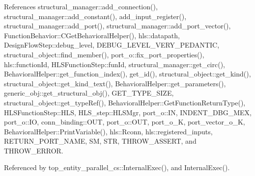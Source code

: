 References structural\+\_\+manager\+::add\+\_\+connection(), structural\+\_\+manager\+::add\+\_\+constant(), add\+\_\+input\+\_\+register(), structural\+\_\+manager\+::add\+\_\+port(), structural\+\_\+manager\+::add\+\_\+port\+\_\+vector(), Function\+Behavior\+::\+C\+Get\+Behavioral\+Helper(), hls\+::datapath, Design\+Flow\+Step\+::debug\+\_\+level, D\+E\+B\+U\+G\+\_\+\+L\+E\+V\+E\+L\+\_\+\+V\+E\+R\+Y\+\_\+\+P\+E\+D\+A\+N\+T\+IC, structural\+\_\+object\+::find\+\_\+member(), port\+\_\+o\+::fix\+\_\+port\+\_\+properties(), hls\+::function\+Id, H\+L\+S\+Function\+Step\+::fun\+Id, structural\+\_\+manager\+::get\+\_\+circ(), Behavioral\+Helper\+::get\+\_\+function\+\_\+index(), get\+\_\+id(), structural\+\_\+object\+::get\+\_\+kind(), structural\+\_\+object\+::get\+\_\+kind\+\_\+text(), Behavioral\+Helper\+::get\+\_\+parameters(), generic\+\_\+obj\+::get\+\_\+structural\+\_\+obj(), G\+E\+T\+\_\+\+T\+Y\+P\+E\+\_\+\+S\+I\+ZE, structural\+\_\+object\+::get\+\_\+type\+Ref(), Behavioral\+Helper\+::\+Get\+Function\+Return\+Type(), H\+L\+S\+Function\+Step\+::\+H\+LS, H\+L\+S\+\_\+step\+::\+H\+L\+S\+Mgr, port\+\_\+o\+::\+IN, I\+N\+D\+E\+N\+T\+\_\+\+D\+B\+G\+\_\+\+M\+EX, port\+\_\+o\+::\+IO, conn\+\_\+binding\+::\+O\+UT, port\+\_\+o\+::\+O\+UT, port\+\_\+o\+\_\+K, port\+\_\+vector\+\_\+o\+\_\+K, Behavioral\+Helper\+::\+Print\+Variable(), hls\+::\+Rconn, hls\+::registered\+\_\+inputs, R\+E\+T\+U\+R\+N\+\_\+\+P\+O\+R\+T\+\_\+\+N\+A\+ME, SM, S\+TR, T\+H\+R\+O\+W\+\_\+\+A\+S\+S\+E\+RT, and T\+H\+R\+O\+W\+\_\+\+E\+R\+R\+OR.



Referenced by top\+\_\+entity\+\_\+parallel\+\_\+cs\+::\+Internal\+Exec(), and Internal\+Exec().


